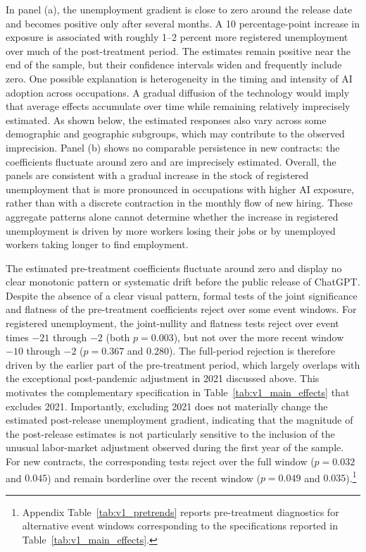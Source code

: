 In panel (a), the unemployment gradient is close to zero around the release date and becomes positive only after several months. A 10 percentage-point increase in exposure is associated with roughly 1--2 percent more registered unemployment over much of the post-treatment period. The estimates remain positive near the end of the sample, but their confidence intervals widen and frequently include zero. One possible explanation is heterogeneity in the timing and intensity of AI adoption across occupations. A gradual diffusion of the technology would imply that average effects accumulate over time while remaining relatively imprecisely estimated. As shown below, the estimated responses also vary across some demographic and geographic subgroups, which may contribute to the observed imprecision. Panel (b) shows no comparable persistence in new contracts: the coefficients fluctuate around zero and are imprecisely estimated. Overall, the panels are consistent with a gradual increase in the stock of registered unemployment that is more pronounced in occupations with higher AI exposure, rather than with a discrete contraction in the monthly flow of new hiring. These aggregate patterns alone cannot determine whether the increase in registered unemployment is driven by more workers losing their jobs or by unemployed workers taking longer to find employment.

The estimated pre-treatment coefficients fluctuate around zero and display no clear monotonic pattern or systematic drift before the public release of ChatGPT. Despite the absence of a clear visual pattern, formal tests of the joint significance and flatness of the pre-treatment coefficients reject over some event windows. For registered unemployment, the joint-nullity and flatness tests reject over event times \(-21\) through \(-2\) (both \(p=0.003\)), but not over the more recent window \(-10\) through \(-2\) (\(p=0.367\) and \(0.280\)). The full-period rejection is therefore driven by the earlier part of the pre-treatment period, which largely overlaps with the exceptional post-pandemic adjustment in 2021 discussed above. This motivates the complementary specification in Table~\ref{tab:v1_main_effects} that excludes 2021. Importantly, excluding 2021 does not materially change the estimated post-release unemployment gradient, indicating that the magnitude of the post-release estimates is not particularly sensitive to the inclusion of the unusual labor-market adjustment observed during the first year of the sample. For new contracts, the corresponding tests reject over the full window (\(p=0.032\) and \(0.045\)) and remain borderline over the recent window (\(p=0.049\) and \(0.035\)).\footnote{Appendix Table~\ref{tab:v1_pretrends} reports pre-treatment diagnostics for alternative event windows corresponding to the specifications reported in Table~\ref{tab:v1_main_effects}.}




